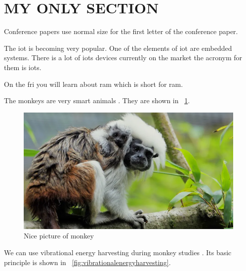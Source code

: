 \section{MY ONLY SECTION}


Conference papers use normal size for the first letter of the conference paper.

The \ac{iot} is becoming very popular. One of the elements of \ac{iot} are embedded systems. There is a lot of \aclp{iot} devices currently on the market the acronym for them is \acsp{iot}.

On the \acf{fri} you will learn about \acs{ram} which is short for \acl{ram}.

The monkeys are very smart animals \cite{article_first}. They are shown in \figurename ~\ref{fig:monkey}. 

\begin{figure}[ht]
	\centering
	\includegraphics[width=1.0\linewidth]{pictures/monkey}
	\caption{Nice picture of monkey \cite{figure_first}}
	\label{fig:monkey}
\end{figure}


We can use vibrational energy harvesting during monkey studies \cite{article_second}. Its basic principle is shown in \figurename  ~\ref{fig:vibrationalenergyharvesting}.

